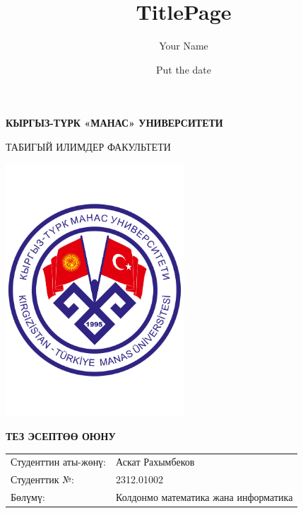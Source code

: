 \documentclass[12pt]{article}
\title{TitlePage}
\author{Your Name}
\date{Put the date}
\begin{document}
\begin{titlepage}
    \begin{center}
            
        \Huge
        \textbf{КЫРГЫЗ-ТҮРК «МАНАС» УНИВЕРСИТЕТИ}
            
        \vspace{0.5cm}
        \LARGE
            ТАБИГЫЙ ИЛИМДЕР ФАКУЛЬТЕТИ
        
        \large
            
        \vspace{1cm}
         
        \includegraphics[width=0.5\textwidth]{Manas_logo.pdf}   
       
        
            
        \vspace{0.5cm}
            
        \Huge
            \textbf{ТЕЗ ЭСЕПТӨӨ ОЮНУ}
            
        \vspace{2cm}
            
        
     \end{center}  
     
\raggedright

\begin{tabular}{@{}l l@{}}
    \Large Студенттин аты-жөнү: & \Large Аскат Рахымбеков \\[1em]
    \Large Студенттик №: & \Large 2312.01002 \\[1em]
    \Large Бөлүмү: & \Large Колдонмо математика жана информатика \\
\end{tabular}

\Large
\Large
    
\end{titlepage}
\end{document}
